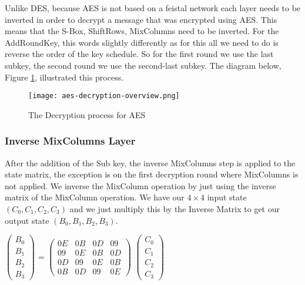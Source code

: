 Unlike DES, because AES is not based on a feistal network each layer needs to be inverted in order to decrypt a message that was encrypted using AES. This means that the S-Box, ShiftRows, MixColumns need to be inverted. For the AddRoundKey, this words slightly differently as for this all we need to do is reverse the order of the key schedule. So for the first round we use the last subkey, the second round we use the second-last subkey. The diagram below, Figure \ref{AES-Dec-Overview}, illustrated this process.

\begin{figure}[H]
\begin{center}
\texttt{[image: aes-decryption-overview.png]}
\end{center}
\caption{The Decryption process for AES}
\label{AES-Dec-Overview}
\end{figure}

\subsubsection{Inverse MixColumns Layer}

After the addition of the Sub key, the inverse MixColumns step is applied to the state matrix, the exception is on the first decryption round where MixColumns is not applied. We inverse the MixColumn operation by just using the inverse matrix of the MixColumn operation. We have our $4\times4$ input state $(C_0, C_1, C_2, C_3)$ and we just multiply this by the Inverse Matrix to get our output state $(B_0, B_1, B_2, B_3)$.

\begin{center}
$
\begin{pmatrix}
B_0 \\
B_1 \\
B_2 \\
B_3
\end{pmatrix} 
$
=
$
\begin{pmatrix}
0E & 0B & 0D & 09 \\
09 & 0E & 0B & 0D \\
0D & 09 & 0E & 0B \\
0B & 0D & 09 & 0E
\end{pmatrix}
$
$
\begin{pmatrix}
C_0 \\
C_1 \\
C_2 \\
C_3 
\end{pmatrix}
$
\end{center}

